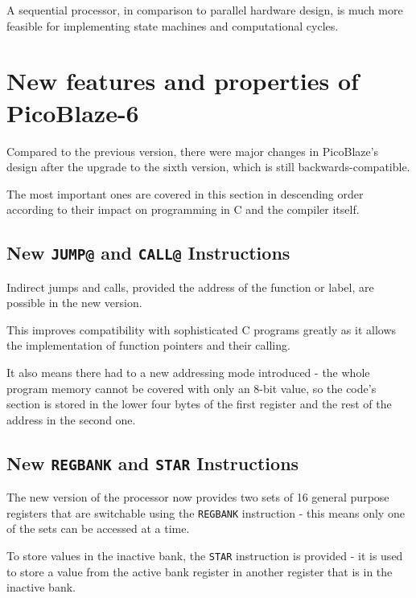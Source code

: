     A sequential processor, in comparison to parallel hardware design, is much more feasible for implementing state machines and computational cycles.


    \section{New features and properties of PicoBlaze-6}

    Compared to the previous version, there were major changes in PicoBlaze's design after the upgrade to the sixth version, which is still backwards-compatible.

    The most important ones are covered in this section in descending order according to their impact on programming in C and the compiler itself.

        \subsection{New \texttt{JUMP@} and \texttt{CALL@} Instructions}\label{jumpat}

        Indirect jumps and calls, provided the address of the function or label, are possible in the new version.

        This improves compatibility with sophisticated C programs greatly as it allows the implementation of function pointers and their calling.

        It also means there had to a new addressing mode introduced - the whole program memory cannot be covered with only an 8-bit value, so the code's section is stored in the lower four bytes of the first register and the rest of the address in the second one.

        \subsection{New \texttt{REGBANK} and \texttt{STAR} Instructions}

        The new version of the processor now provides two sets of 16 general purpose registers that are switchable using the \texttt{REGBANK} instruction - this means only one of the sets can be accessed at a time.

        To store values in the inactive bank, the \texttt{STAR} instruction is provided - it is used to store a value from the active bank register in another register that is in the inactive bank.


